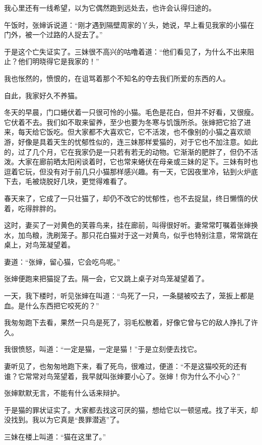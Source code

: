 \documentclass[12pt,UTF-8,openany]{ctexbook}
\begin{document}
\begin{large}
    我心里还有一线希望，以为它偶然跑到远处去，也许会认得归途的。
    
    午饭时，张婶诉说道：“刚才遇到隔壁周家的丫头，她说，早上看见我家的小猫在门外，被一个过路的人捉去了。”
    
    于是这个亡失证实了。三妹很不高兴的咕噜着道：“他们看见了，为什么不出来阻止？他们明晓得它是我家的！”
    
    我也怅然的，愤恨的，在诅骂着那个不知名的夺去我们所爱的东西的人。
    
    自此，我家好久不养猫。
    
    冬天的早晨，门口蜷伏着一只很可怜的小猫。毛色是花白，但并不好看，又很瘦。它伏着不去。我们如不取来留养，至少也要为冬寒与饥饿所杀。张婶把它拾了进来，每天给它饭吃。但大家都不大喜欢它，它不活泼，也不像别的小猫之喜欢顽游，好像是具着天生的忧郁性似的，连三妹那样爱猫的，对于它也不加注意。如此的，过了几个月，它在我家仍是一只若有若无的动物。它渐渐的肥胖了，但仍不活泼。大家在廊前晒太阳闲谈着时，它也常来蜷伏在母亲或三妹的足下。三妹有时也逗着它玩，但没有对于前几只小猫那样感兴趣。有一天，它因夜里冷，钻到火炉底下去，毛被烧脱好几块，更觉得难看了。
    
    春天来了，它成了一只壮猫了，却仍不改它的忧郁性，也不去捉鼠，终日懒惰的伏着，吃得胖胖的。
    
    这时，妻买了一对黄色的芙蓉鸟来，挂在廊前，叫得很好听。妻常常叮嘱着张婶换水，加鸟粮，洗刷笼子。那只花白猫对于这一对黄鸟，似乎也特别注意，常常跳在桌上，对鸟笼凝望着。
    
    妻道：“张婶，留心猫，它会吃鸟呢。”
    
    张婶便跑来把猫捉了去。隔一会，它又跳上桌子对鸟笼凝望着了。
    
    一天，我下楼时，听见张婶在叫道：“鸟死了一只，一条腿被咬去了，笼扳上都是血。是什么东西把它咬死的？”
    
    我匆匆跑下去看，果然一只鸟是死了，羽毛松散着，好像它曾与它的敌人挣扎了许久。
    
    我很愤怒，叫道：“一定是猫，一定是猫！”于是立刻便去找它。
    
    妻听见了，也匆匆地跑下来，看了死鸟，很难过，便道：“不是这猫咬死的还有谁？它常常对鸟笼望着，我早就叫张婶要小心了。张婶！你为什么不小心？”
    
    张婶默默无言，不能有什么话来辩护。
    
    于是猫的罪状证实了。大家都去找这可厌的猫，想给它以一顿惩戒。找了半天，却没找到。我以为它真是“畏罪潜逃”了。
    
    三妹在楼上叫道：“猫在这里了。”
    

\end{large}
\end{document}
